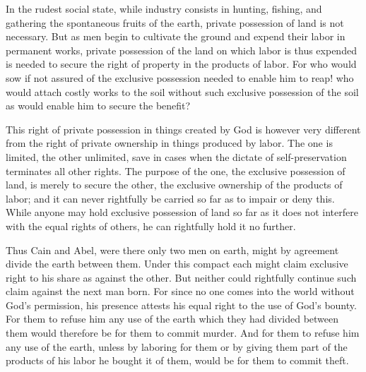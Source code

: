 \documentclass{book}
\begin{document}
In the rudest social state, while industry consists in hunting, fishing, and gathering the spontaneous fruits of the earth, private possession of land is not necessary. But as men begin to cultivate the ground and expend their labor in permanent works, private possession of the land on which labor is thus expended is needed to secure the right of property in the products of labor. For who would sow if not assured of the exclusive possession needed to enable him to reap! who would attach costly works to the soil without such exclusive possession of the soil as would enable him to secure the benefit?

This right of private possession in things created by God is however very different from the right of private ownership in things produced by labor. The one is limited, the other unlimited, save in cases when the dictate of self-preservation terminates all other rights. The purpose of the one, the exclusive possession of land, is merely to secure the other, the exclusive ownership of the products of labor; and it can never rightfully be carried so far as to impair or deny this. While anyone may hold exclusive possession of land so far as it does not interfere with the equal rights of others, he can rightfully hold it no further.

Thus Cain and Abel, were there only two men on earth, might by agreement divide the earth between them. Under this compact each might claim exclusive right to his share as against the other. But neither could rightfully continue such claim against the next man born. For since no one comes into the world without God’s permission, his presence attests his equal right to the use of God’s bounty. For them to refuse him any use of the earth which they had divided between them would therefore be for them to commit murder. And for them to refuse him any use of the earth, unless by laboring for them or by giving them part of the products of his labor he bought it of them, would be for them to commit theft.
\end{document}
